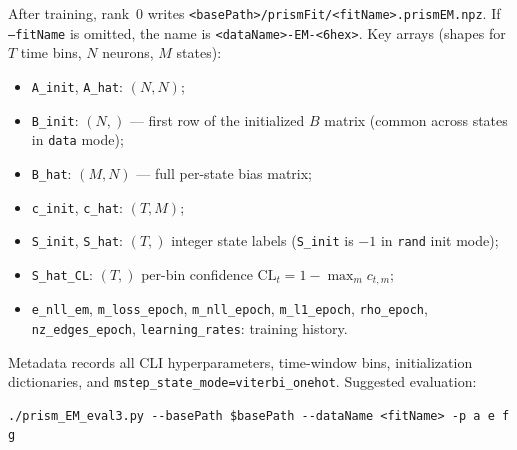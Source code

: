 \documentclass[11pt]{article}
\begin{document}
After training, rank~0 writes \texttt{<basePath>/prismFit/<fitName>.prismEM.npz}.
If \texttt{--fitName} is omitted, the name is
\texttt{<dataName>-EM-<6hex>}.
Key arrays (shapes for \(T\) time bins, \(N\) neurons, \(M\) states):
\begin{itemize}
  \item \texttt{A\_init}, \texttt{A\_hat}: \((N,N)\);
  \item \texttt{B\_init}: \((N,)\) --- first row of the initialized \(B\) matrix
        (common across states in \texttt{data} mode);
  \item \texttt{B\_hat}: \((M,N)\) --- full per-state bias matrix;
  \item \texttt{c\_init}, \texttt{c\_hat}: \((T,M)\);
  \item \texttt{S\_init}, \texttt{S\_hat}: \((T,)\) integer state labels
        (\texttt{S\_init} is \(-1\) in \texttt{rand} init mode);
  \item \texttt{S\_hat\_CL}: \((T,)\) per-bin confidence
        \(\mathrm{CL}_t = 1-\max_m c_{t,m}\);
  \item \texttt{e\_nll\_em}, \texttt{m\_loss\_epoch}, \texttt{m\_nll\_epoch},
        \texttt{m\_l1\_epoch}, \texttt{rho\_epoch}, \texttt{nz\_edges\_epoch},
        \texttt{learning\_rates}: training history.
\end{itemize}
Metadata records all CLI hyperparameters, time-window bins, initialization
dictionaries, and \texttt{mstep\_state\_mode=viterbi\_onehot}.
Suggested evaluation:
\begin{verbatim}
./prism_EM_eval3.py --basePath $basePath --dataName <fitName> -p a e f g
\end{verbatim}
\end{document}
